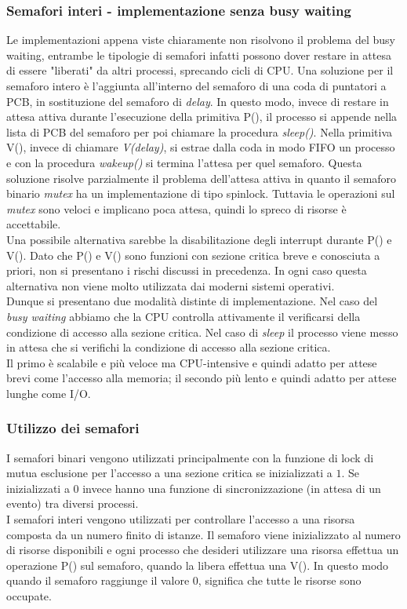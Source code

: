 \subsubsection{Semafori interi - implementazione senza busy waiting}
Le implementazioni appena viste chiaramente non risolvono il problema del busy waiting, entrambe le tipologie di semafori infatti possono dover restare in attesa di essere "liberati" da altri processi, sprecando cicli di CPU. Una soluzione per il semaforo intero è l'aggiunta all'interno del semaforo di una coda di puntatori a PCB, in sostituzione del semaforo di \emph{delay}. In questo modo, invece di restare in attesa attiva durante l'esecuzione della primitiva P(), il processo si appende nella lista di PCB del semaforo per poi chiamare la procedura \emph{sleep()}.
Nella primitiva V(), invece di chiamare \emph{V(delay)}, si estrae dalla coda in modo FIFO un processo e con la procedura \emph{wakeup()} si termina l'attesa per quel semaforo.
Questa soluzione risolve parzialmente il problema dell'attesa attiva in quanto il semaforo binario \emph{mutex} ha un implementazione di tipo spinlock. Tuttavia le operazioni sul \emph{mutex} sono veloci e implicano poca attesa, quindi lo spreco di risorse è accettabile.
\\
Una possibile alternativa sarebbe la disabilitazione degli interrupt durante P() e V(). Dato che P() e V() sono funzioni con sezione critica breve e conosciuta a priori, non si presentano i rischi discussi in precedenza. In ogni caso questa alternativa non viene molto utilizzata dai moderni sistemi operativi.
\\
Dunque si presentano due modalità distinte di implementazione. Nel caso del \emph{busy waiting} abbiamo che la CPU controlla attivamente il verificarsi della condizione di accesso alla sezione critica. Nel caso di \emph{sleep} il processo viene messo in attesa che si verifichi la condizione di accesso alla sezione critica. \\
Il primo è scalabile e più veloce ma CPU-intensive e quindi adatto per attese brevi come l'accesso alla memoria; il secondo più lento e quindi adatto per attese lunghe come I/O.

\subsubsection{Utilizzo dei semafori}
I semafori binari vengono utilizzati principalmente con la funzione di lock di mutua esclusione per l'accesso a una sezione critica se inizializzati a $1$. Se inizializzati a $0$ invece hanno una funzione di sincronizzazione (in attesa di un evento) tra diversi processi.
\\
I semafori interi vengono utilizzati per controllare l'accesso a una risorsa composta da un numero finito di istanze. Il semaforo viene inizializzato al numero di risorse disponibili e ogni processo che desideri utilizzare una risorsa effettua un operazione P() sul semaforo, quando la libera effettua una V(). In questo modo quando il semaforo raggiunge il valore $0$, significa che tutte le risorse sono occupate.

